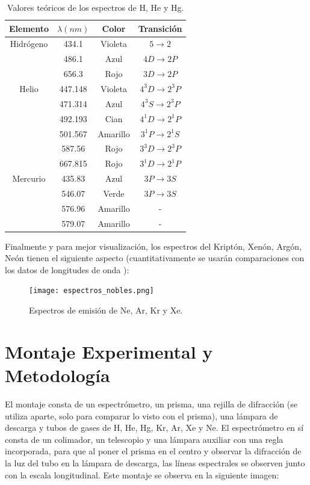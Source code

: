 \documentclass[%
 reprint,
 amsmath,amssymb,
 aps,
]{revtex4-1}
\begin{document}
\begin{table}[H]
    \centering
    \begin{tabular}{|c|c|c|c|}
    \hline
    Elemento & $\lambda (nm)$ & Color & Transición \\ \hline
    Hidrógeno & 434.1 & Violeta & $5\rightarrow2$ \\
     & 486.1 & Azul & $4D\rightarrow2P$ \\
     & 656.3 & Rojo & $3D\rightarrow2P$ \\ \hline
    Helio & 447.148 & Violeta & $4^3D\rightarrow2^3P$ \\
     & 471.314 & Azul & $4^3S\rightarrow2^3P$ \\
     & 492.193 & Cian & $4^1D\rightarrow2^1P$ \\
     & 501.567 & Amarillo & $3^1P\rightarrow2^1S$\\
     & 587.56 & Rojo & $3^3D\rightarrow2^3P$\\
     & 667.815 & Rojo & $3^1D\rightarrow2^1P$\\ \hline
    Mercurio & 435.83 & Azul & $3P\rightarrow3S$ \\
     & 546.07 & Verde & $3P\rightarrow3S$ \\
     & 576.96 & Amarillo & - \\
     & 579.07 & Amarillo & - \\ \hline
    \end{tabular}
    \caption{Valores teóricos de los espectros de H, He y Hg.\cite{nist}}
    \label{tab:teoria}
\end{table}

Finalmente y para mejor visualización, los espectros del Kriptón, Xenón, Argón, Neón tienen el siguiente aspecto (cuantitativamente se usarán comparaciones con los datos de longitudes de onda \cite{nobles}): 

\begin{figure}[H]
    \centering
    \texttt{[image: espectros\_nobles.png]}
    \caption{Espectros de emisión de Ne, Ar, Kr y Xe. \cite{ohio}}
    \label{fig:espectrosnobles}
\end{figure}


\section{Montaje Experimental y Metodología}
El montaje consta de un espectrómetro, un prisma, una rejilla de difracción (se utiliza aparte, solo para comparar lo visto con el prisma), una lámpara de descarga y tubos de gases de H, He, Hg, Kr, Ar, Xe y Ne. El espectrómetro en sí consta de un colimador, un telescopio y una lámpara auxiliar con una regla incorporada, para que al poner el prisma en el centro y observar la difracción de la luz del tubo en la lámpara de descarga, las líneas espectrales se observen junto con la escala longitudinal. Este montaje se observa en la siguiente imagen:
\end{document}
